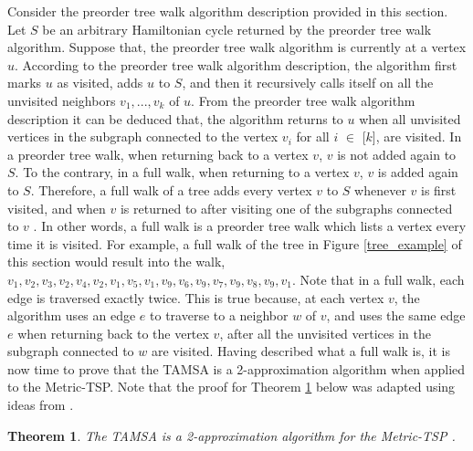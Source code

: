 \documentclass[12pt]{article}
\newtheorem{theorem}[definition]{Theorem}
\numberwithin{equation}{subsection}
\numberwithin{table}{subsection}
\begin{document}
Consider the preorder tree walk algorithm description provided in this section. Let $S$ be an arbitrary Hamiltonian cycle returned by the preorder tree walk algorithm. Suppose that, the preorder tree walk algorithm is currently at a vertex $u$. According to the preorder tree walk algorithm description, the algorithm first marks $u$ as visited, adds $u$ to $S$, and then it recursively calls itself on all the unvisited neighbors $v_1, ..., v_k$ of $u$. From the preorder tree walk algorithm description it can be deduced that, the algorithm returns to $u$ when all unvisited vertices in the subgraph connected to the vertex $v_i$ for all $i$ $\in$ [$k$], are visited. In a preorder tree walk, when returning back to a vertex $v$, $v$ is not added again to $S$. To the contrary, in a full walk, when returning to a vertex $v$, $v$ is added again to $S$. Therefore, a full walk of a tree adds every vertex $v$ to $S$ whenever $v$ is first visited, and when $v$ is returned to after visiting one of the subgraphs connected to $v$ \cite{cormen_leiserson_rivest_stein}. In other words, a full walk is a preorder tree walk which lists a vertex every time it is visited. For example, a full walk of the tree in Figure \ref{tree_example} of this section would result into the walk, $v_1, v_2, v_3, v_2, v_4, v_2, v_1, v_5, v_1, v_9, v_6, v_9, v_7, v_9, v_8, v_9, v_1$. Note that in a full walk, each edge is traversed exactly twice. This is true because, at each vertex $v$, the algorithm uses an edge $e$ to traverse to a neighbor $w$ of $v$, and uses the same edge $e$ when returning back to the vertex $v$, after all the unvisited vertices in the subgraph connected to $w$ are visited. Having described what a full walk is, it is now time to prove that the TAMSA is a 2-approximation algorithm when applied to the Metric-TSP. Note that the proof for Theorem \ref{2_approx} below was adapted using ideas from \cite{cormen_leiserson_rivest_stein}.
\begin{theorem}
\label{2_approx}
The TAMSA is a 2-approximation algorithm for the Metric-TSP {}.
\end{theorem}
\end{document}
